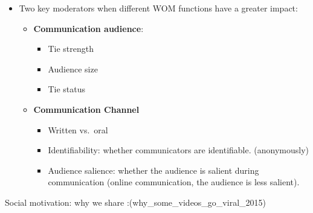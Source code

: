 \documentclass[
]{book}
\providecommand{\tightlist}{%
  \setlength{\itemsep}{0pt}\setlength{\parskip}{0pt}}
\begin{document}
\begin{itemize}
\item
  Two key moderators when different WOM functions have a greater impact:

  \begin{itemize}
  \item
    \textbf{Communication audience}:

    \begin{itemize}
    \tightlist
    \item
      Tie strength
    \item
      Audience size
    \item
      Tie status
    \end{itemize}
  \item
    \textbf{Communication Channel}

    \begin{itemize}
    \tightlist
    \item
      Written vs.~oral
    \item
      Identifiability: whether communicators are identifiable. (anonymously)
    \item
      Audience salience: whether the audience is salient during communication (online communication, the audience is less salient).
    \end{itemize}
  \end{itemize}
\end{itemize}

Social motivation: why we share :(why\_some\_videos\_go\_viral\_2015)
\end{document}
